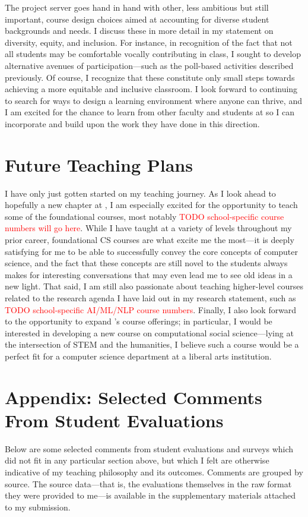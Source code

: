 \documentclass[12pt,letterpaper]{article}
\begin{document}
The project server goes hand in hand with other, less ambitious but still important, course design choices aimed at accounting for diverse student backgrounds and needs.
\iflongdei
I discuss these in more detail in my statement on diversity, equity, and inclusion.
\else
For instance, in recognition of the fact that not all students may be comfortable vocally contributing in class, I sought to develop alternative avenues of participation---such as the poll-based activities described previously.
\fi
Of course, I recognize that these constitute only small steps towards achieving a more equitable and inclusive classroom.
I look forward to continuing to search for ways to design a learning environment where anyone can thrive, and I am excited for the chance to learn from other faculty and students at \schoolname so I can incorporate and build upon the work they have done in this direction.

\section{Future Teaching Plans}
I have only just gotten started on my teaching journey.
As I look ahead to hopefully a new chapter at \schoolname, I am especially excited for the opportunity to teach some of the foundational courses, most notably \textcolor{red}{TODO school-specific course numbers will go here}.
While I have taught at a variety of levels throughout my prior career, foundational CS courses are what excite me the most---it is deeply satisfying for me to be able to successfully convey the core concepts of computer science, and the fact that these concepts are still novel to the students always makes for interesting conversations that may even lead me to see old ideas in a new light.
That said, I am still also passionate about teaching higher-level courses related to the research agenda I have laid out in my research statement, such as \textcolor{red}{TODO school-specific AI/ML/NLP course numbers}.
Finally, I also look forward to the opportunity to expand \schoolname's course offerings; in particular, I would be interested in developing a new course on computational social science---lying at the intersection of STEM and the humanities, I believe such a course would be a perfect fit for a computer science department at a liberal arts institution.

\ifappendix
\vspace{\baselineskip}
\section{Appendix: Selected Comments From Student Evaluations}
Below are some selected comments from student evaluations and surveys which did not fit in any particular section above, but which I felt are otherwise indicative of my teaching philosophy and its outcomes.
Comments are grouped by source.
The source data---that is, the evaluations themselves in the raw format they were provided to me---is available in the supplementary materials attached to my submission.
\end{document}

